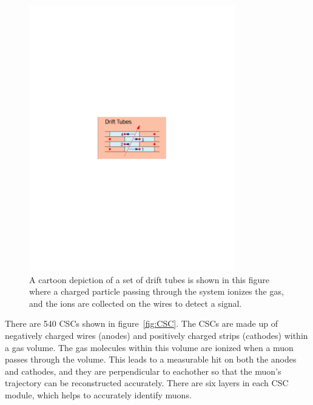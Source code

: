 \begin{figure}[!htb]
  \begin{center}
    \includegraphics[width=0.8\textwidth]{cms/figs/DT.pdf}
    \caption{
      \label{fig:DT}
      A cartoon depiction of a set of drift tubes is shown in this figure
      where a charged particle passing through the system ionizes the gas,
      and the ions are collected on the wires to detect a signal.      
    }
  \end{center}
\end{figure}

There are 540 CSCs shown in figure~\ref{fig:CSC}.
The CSCs are made up of negatively charged wires (anodes) and positively charged strips (cathodes) within a gas volume.
The gas molecules within this volume are ionized when a muon passes through the volume.
This leads to a measurable hit on both the anodes and cathodes, and they are perpendicular to eachother so that the muon's trajectory can be reconstructed accurately.
There are six layers in each CSC module, which helps to accurately identify muons.

